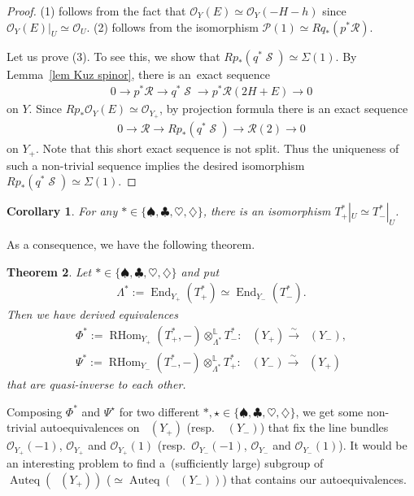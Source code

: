 \documentclass[10pt,a4paper]{amsart}
\DeclareMathOperator{\Auteq}{Auteq}
\DeclareMathOperator{\D}{D^b}
\DeclareMathOperator{\End}{End}
\DeclareMathOperator{\RHom}{RHom}
\DeclareMathOperator{\Spi}{\mathcal{S}}
\newcommand{\stsh}{\mathcal{O}}
\numberwithin{equation}{section}
\newtheorem{Theorem}{Theorem}[section]
\newtheorem{Corollary}[Theorem]{Corollary}
\begin{document}
\begin{proof}
(1) follows from the fact that $\stsh_Y(E) \simeq \stsh_Y(-H-h)$ since $\stsh_Y(E)|_U \simeq \stsh_U$.
(2) follows from the isomorphism $\mathcal{P}(1) \simeq Rq_*(p^*\mathcal{R})$.

Let us prove (3).
To see this, we show that $Rp_*(q^*\Spi) \simeq \Sigma(1)$.
By Lemma~\ref{lem Kuz spinor}, there is an~exact sequence
\begin{gather*}
0 \to p^*\mathcal{R} \to q^* \Spi \to p^* \mathcal{R}(2H+E) \to 0
\end{gather*}
on $Y$.
Since $Rp_*\stsh_Y(E) \simeq \stsh_{Y_+}$, by projection formula there is an exact sequence
\begin{gather*}
0 \to \mathcal{R} \to Rp_*(q^* \Spi) \to \mathcal{R}(2) \to 0
\end{gather*}
on $Y_+$.
Note that this short exact sequence is not split.
Thus the uniqueness of such a non-trivial sequence implies the desired isomorphism $Rp_*(q^*\Spi) \simeq \Sigma(1)$.
\end{proof}

\begin{Corollary}
For any $\ast \in \{ \spadesuit, \clubsuit, \heartsuit, \diamondsuit \}$, there is an isomorphism $T_+^{\ast}|_U \simeq T_-^{\ast}|_U$.
\end{Corollary}

As a consequence, we have the following theorem.


\begin{Theorem}
Let $\ast \in \{ \spadesuit, \clubsuit, \heartsuit, \diamondsuit \}$ and put
\begin{gather*}
\Lambda^{\ast} := \End_{Y_+}(T_+^{\ast}) \simeq \End_{Y_-}(T_-^{\ast}).
\end{gather*}
Then we have derived equivalences
\begin{align*}
\Phi^{\ast} := \RHom_{Y_+}(T^{\ast}_+, -) \otimes^{\mathbb{L}}_{\Lambda^{\ast}} T_-^{\ast}\colon\ \D(Y_+) \xrightarrow{\sim} \D(Y_-), \\
\Psi^{\ast} := \RHom_{Y_-}(T^{\ast}_-, -) \otimes^{\mathbb{L}}_{\Lambda^{\ast}} T_+^{\ast}\colon\ \D(Y_-) \xrightarrow{\sim} \D(Y_+)
\end{align*}
that are quasi-inverse to each other.
\end{Theorem}


\begin{Remark} \rm
Composing $\Phi^{\ast}$ and $\Psi^{\star}$ for two different $\ast, \star \in \{ \spadesuit, \clubsuit, \heartsuit, \diamondsuit \}$,
we get some non-trivial autoequivalences on $\D(Y_+)$ (resp.~$\D(Y_-)$) that fix the line bundles $\stsh_{Y_+}(-1)$, $\stsh_{Y_+}$ and $\stsh_{Y_+}(1)$
(resp.~$\stsh_{Y_-}(-1)$, $\stsh_{Y_-}$ and $\stsh_{Y_-}(1)$).
It would be an interesting problem to find a~(sufficiently large) subgroup of $\Auteq(\D(Y_+))$ ($\simeq \Auteq(\D(Y_-))$) that contains our autoequivalences.
\end{Remark}
\end{document}
